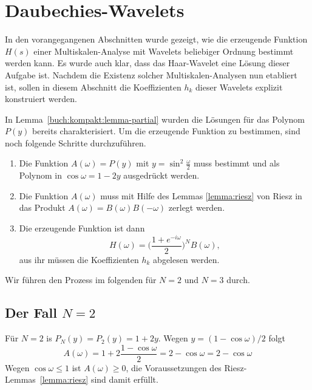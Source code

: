 %
%
%
\section{Daubechies-Wavelets\label{section:daubechies}}
In den vorangegangenen Abschnitten wurde gezeigt, wie die erzeugende
Funktion $H(s)$ einer Multi\-skalen-Analyse mit Wavelets beliebiger
Ordnung bestimmt werden kann.
Es wurde auch klar, dass das Haar-Wavelet eine Lösung dieser Aufgabe
ist.
Nachdem die Existenz solcher Multiskalen-Ana\-ly\-sen nun etabliert ist,
sollen in diesem Abschnitt die Koeffizienten $h_k$ dieser Wavelets
explizit konstruiert werden.

In Lemma~\ref{buch:kompakt:lemma-partial} wurden die Lösungen für das
Polynom $P(y)$ bereits charakterisiert.
Um die erzeugende Funktion zu bestimmen, sind noch folgende Schritte
durchzuführen.
\begin{enumerate}
\item
Die Funktion $A(\omega)=P(y)$ mit $y=\sin^2\frac{\omega}2$ muss
bestimmt und als Polynom in $\cos\omega=1-2y$ ausgedrückt werden.
\item
Die Funktion $A(\omega)$ muss mit Hilfe des Lemmas \ref{lemma:riesz}
von Riesz in das Produkt $A(\omega)=B(\omega)B(-\omega)$ zerlegt
werden.
\item
Die erzeugende Funktion ist dann
\[
H(\omega)
=
\biggl(
\frac{1+e^{-i\omega}}2
\biggr)^N
B(\omega),
\]
aus ihr müssen die Koeffizienten $h_k$ abgelesen werden.
\end{enumerate}

Wir führen den Prozess im folgenden für $N=2$ und $N=3$ durch.

\subsection{Der Fall $N=2$}
Für $N=2$ is $P_N(y)=P_2(y)=1+2y$.
Wegen $y=(1-\cos \omega)/2$ folgt
\[
A(\omega) = 1 + 2\frac{1-\cos\omega}2 = 2-\cos\omega
= 2- \cos\omega
\]
Wegen $\cos\omega\le 1$ ist $A(\omega) \ge 0$, die Voraussetzungen des
Riesz-Lemmas~\ref{lemma:riesz} sind damit erfüllt.

